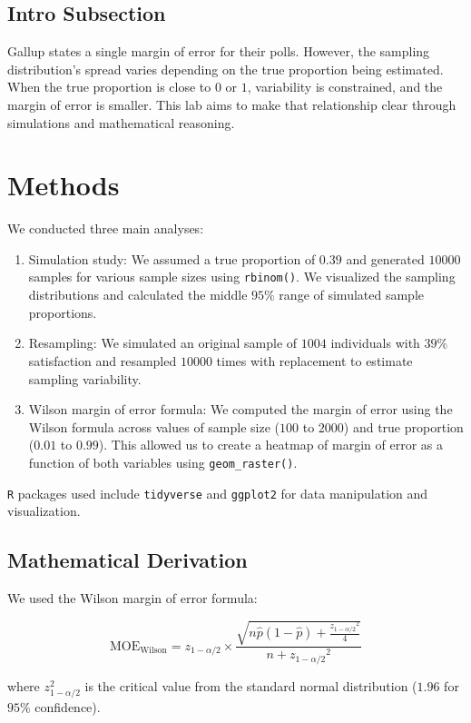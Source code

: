 \documentclass{article}\usepackage[]{graphicx}\usepackage[]{xcolor}
\begin{document}
\begin{multicols}{2}
\subsection{Intro Subsection}
Gallup states a single margin of error for their polls. However, the sampling distribution's spread varies depending on the true proportion being estimated. When the true proportion is close to $0$ or $1$, variability is constrained, and the margin of error is smaller. This lab aims to make that relationship clear through simulations and mathematical reasoning.

\section{Methods}

We conducted three main analyses:
\begin{enumerate}
\item Simulation study: We assumed a true proportion of $0.39$ and generated $10000$ samples for various sample sizes using \texttt{rbinom()}. We visualized the sampling distributions and calculated the middle $95\%$ range of simulated sample proportions.
\item Resampling: We simulated an original sample of $1004$ individuals with $39\%$ satisfaction and resampled $10000$ times with replacement to estimate sampling variability.
\item Wilson margin of error formula: We computed the margin of error using the Wilson formula across values of sample size ($100$ to $2000$) and true proportion ($0.01$ to $0.99$). This allowed us to create a heatmap of margin of error as a function of both variables using \texttt{geom\_raster()}.
\end{enumerate}

\texttt{R} packages used include \texttt{tidyverse} \citep{tidyverse} and \texttt{ggplot2} \citep{ggplot} for data manipulation and visualization.

\subsection{Mathematical Derivation}

We used the Wilson margin of error formula:

\[
\text{MOE}_{\text{Wilson}} = z_{1-\alpha/2} \times \frac{ \sqrt{ n\hat{p}(1-\hat{p}) + \frac{{z_{1-\alpha/2}}^2}{4} } }{ n + {z_{1-\alpha/2}}^2 }
\]


where $z_{1-\alpha/2}^2$ is the critical value from the standard normal distribution ($1.96$ for $95\%$ confidence).



\end{multicols}
\end{document}
